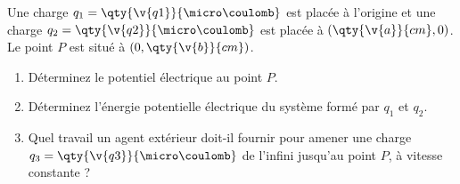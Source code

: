 Une charge $q_1 = \qty{\v{q1}}{\micro\coulomb}$ est placée à l'origine et une charge $q_2 = \qty{\v{q2}}{\micro\coulomb}$ est placée à $(\qty{\v{a}}{cm}, 0)$. Le point $P$ est situé à $(0, \qty{\v{b}}{cm})$.

\begin{center}
\end{center}

\begin{enumerate}[label=\alph*)]
    \item Déterminez le potentiel électrique au point $P$.
    \item Déterminez l'énergie potentielle électrique du système formé par $q_1$ et $q_2$.
    \item Quel travail un agent extérieur doit-il fournir pour amener une charge $q_3 = \qty{\v{q3}}{\micro\coulomb}$ de l'infini jusqu'au point $P$, à vitesse constante ?
\end{enumerate}
